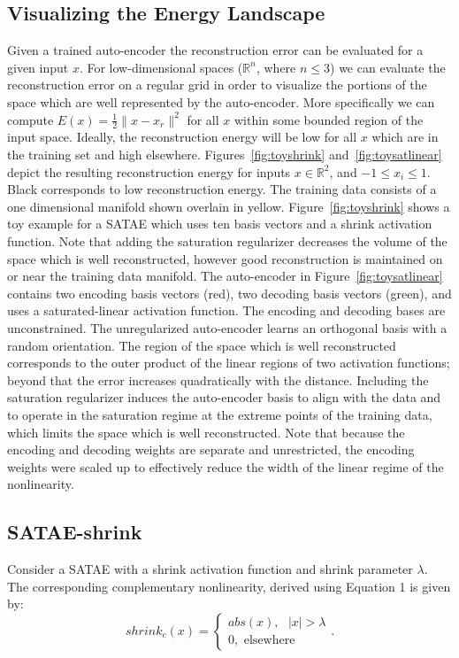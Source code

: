 \subsection{Visualizing the Energy Landscape}  Given a trained auto-encoder the
reconstruction error can be evaluated for a given input $x$. For
low-dimensional spaces ($\mathbb{R}^n$, where $n \leq 3$) we can evaluate the
reconstruction error on a regular grid in order to visualize the portions of
the space which are well represented by the auto-encoder. More specifically we
can compute $E(x) = \frac{1}{2} \|x - x_r \|^2$ for all $x$ within some bounded
region of the input space. Ideally, the reconstruction energy will be low for
all $x$ which are in the training set and high elsewhere.
Figures~\ref{fig:toyshrink} and~\ref{fig:toysatlinear} depict the resulting
reconstruction energy for inputs $x \in \mathbb{R}^2$, and  $-1 \leq x_i \leq
1$. Black corresponds to low reconstruction energy. The training data consists
of a one dimensional manifold shown overlain in yellow.
Figure~\ref{fig:toyshrink} shows a toy example for a SATAE which uses ten basis
vectors and a shrink activation function. Note that adding the saturation
regularizer decreases the volume of the space which is well reconstructed,
however good reconstruction is maintained on or near the training data
manifold. The auto-encoder in Figure~\ref{fig:toysatlinear} contains two
encoding basis vectors (red), two decoding basis vectors (green), and uses a
saturated-linear activation function. The encoding and decoding bases are
unconstrained. The unregularized auto-encoder learns an orthogonal basis with a
random orientation. The region of the space which is well reconstructed
corresponds to the outer product of the linear regions of two activation
functions; beyond that the error increases quadratically with the distance.
Including the saturation regularizer induces the auto-encoder basis to align
with the data and to operate in the saturation regime at the extreme points of
the training data, which limits the space which is well reconstructed. Note
that because the encoding and decoding weights are separate and unrestricted,
the encoding weights were scaled up to effectively reduce the width of the
linear regime of the nonlinearity. 

\subsection{SATAE-shrink} Consider a SATAE with a shrink activation function
and shrink parameter $\lambda$. The corresponding complementary nonlinearity,
derived using Equation 1 is given by: \begin{equation} \nonumber shrink_c(x) =
\begin{cases} abs(x), \text{ } |x| > \lambda\\ 0, \text{ elsewhere}
\end{cases}.  \end{equation} 

